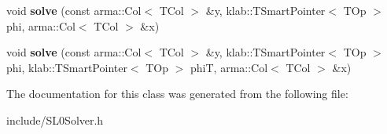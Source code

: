 \begin{DoxyCompactItemize}
\item 
void {\bfseries solve} (const arma\+::\+Col$<$ T\+Col $>$ \&y, klab\+::\+T\+Smart\+Pointer$<$ T\+Op $>$ phi, arma\+::\+Col$<$ T\+Col $>$ \&x)\hypertarget{classkl1p_1_1TSL0Solver_ad623554e4acf77491ff336fb342f6e46}{}\label{classkl1p_1_1TSL0Solver_ad623554e4acf77491ff336fb342f6e46}

\item 
void {\bfseries solve} (const arma\+::\+Col$<$ T\+Col $>$ \&y, klab\+::\+T\+Smart\+Pointer$<$ T\+Op $>$ phi, klab\+::\+T\+Smart\+Pointer$<$ T\+Op $>$ phiT, arma\+::\+Col$<$ T\+Col $>$ \&x)\hypertarget{classkl1p_1_1TSL0Solver_a52b24fba9d614f64b4bd5c8817d719bc}{}\label{classkl1p_1_1TSL0Solver_a52b24fba9d614f64b4bd5c8817d719bc}

\end{DoxyCompactItemize}


The documentation for this class was generated from the following file\+:\begin{DoxyCompactItemize}
\item 
include/S\+L0\+Solver.\+h\end{DoxyCompactItemize}
